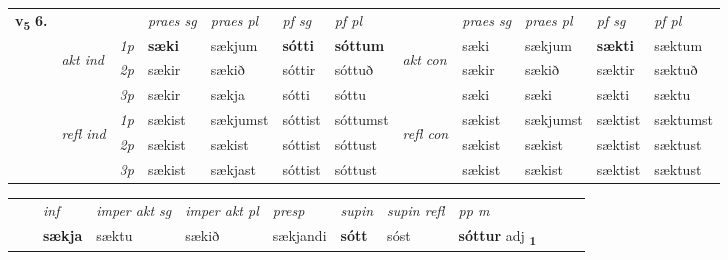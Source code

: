 \begin{tabular}{llllllllllll} \toprule
\multirow{4}{*}{{{\textbf{v{\textsubscript{5}}} \Large{\textbf{6.}}}}}  & &   &  \textit{praes sg}  & \textit{praes pl}  &\textit{ pf sg} & \textit{pf pl} &  &  \textit{praes sg}  & \textit{praes pl}  & \textit{pf sg} & \textit{pf pl } \\*
	\cmidrule{4-7} \cmidrule{9-12}
 & \multirow{3}{*}{\begin{turn}{90}\textit{akt ind}\end{turn}} & {\textit{1p}} & \textbf{sæki} & sækjum    & \textbf{sótti} & \textbf{sóttum} & \multirow{3}{*}{\begin{turn}{90}\textit{akt con}\end{turn}} &sæki & sækjum & \textbf{sækti} & sæktum\\*
& &  {\textit{2p}} &  sækir  & sækið   & sóttir & sóttuð & & sækir & sækið & sæktir & sæktuð \\*
& &  {\textit{3p}} & sækir & sækja   & sótti & sóttu & & sæki & sæki& sækti & sæktu  \\*
\cmidrule{4-7} \cmidrule{9-12}
 &\multirow{3}{*}{\begin{turn}{90}\textit{refl ind}\end{turn}} & {\textit{1p}} & sækist & sækjumst    & sóttist & sóttumst & \multirow{3}{*}{\begin{turn}{90}\textit{refl con}\end{turn}}  &sækist & sækjumst & sæktist & sæktumst\\*
 &&  {\textit{2p}} &  sækist  & sækist   & sóttist & sóttust & &sækist & sækist & sæktist & sæktust \\*
& &  {\textit{3p}} & sækist & sækjast   & sóttist & sóttust & & sækist & sækist& sæktist & sæktust  \\*
\cmidrule{4-7} \cmidrule{9-12}
\end{tabular}


\begin{tabular}{llllllllllll}
 & & \textit{inf} & \textit{imper akt sg} & \textit{imper akt pl}   & \textit{presp} & \textit{supin} & \textit{supin refl} & \textit{pp m}     \\*
  & & \textbf{sækja} & sæktu  & sækið   & sækjandi &  \textbf{sótt} & sóst & \textbf{sóttur} adj \textbf{\textsubscript{1}} \\*
\cmidrule{1-12}
\end{tabular}



